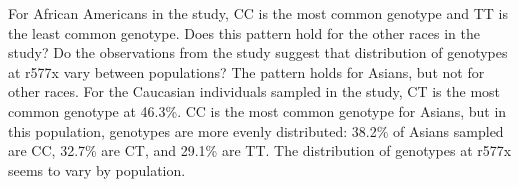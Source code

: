 
\begin{examplewrap}
\begin{nexample}{For African Americans in the study, CC is the most common genotype and TT is the least common genotype. Does this pattern hold for the other races in the study? Do the observations from the study suggest that distribution of genotypes at r577x vary between populations?} 
	The pattern holds for Asians, but not for other races. For the Caucasian individuals sampled in the study, CT is the most common genotype at 46.3\%. CC is the most common genotype for Asians, but in this population, genotypes are more evenly distributed: 38.2\% of Asians sampled are CC, 32.7\% are CT, and 29.1\% are TT. The distribution of genotypes at r577x seems to vary by population.
\end{nexample}
\end{examplewrap}



